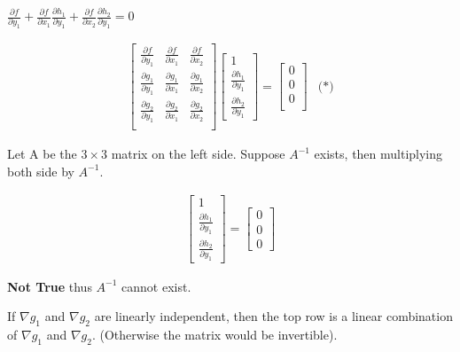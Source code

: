 \documentclass[11pt]{article}
\begin{document}
\(\frac{\partial f}{\partial y_1} + \frac{\partial f}{\partial x_1}\frac{\partial h_1}{\partial y_1} + \frac{\partial f}{\partial x_2} \frac{\partial h_2}{\partial y_1} = 0\)

\begin{equation}
\begin{split}
\begin{bmatrix}
\frac{\partial f}{\partial y_1} & \frac{\partial f}{\partial x_1} & \frac{\partial f}{\partial x_2}\\
\frac{\partial g_1}{\partial y_1} & \frac{\partial g_1}{\partial x_1} & \frac{\partial g_1}{\partial x_2}\\
\frac{\partial g_2}{\partial y_1} & \frac{\partial g_2}{\partial x_1} & \frac{\partial g_2}{\partial x_2}\\
\end{bmatrix} \begin{bmatrix}
1\\ \frac{\partial h_1}{\partial y_1}\\ \frac{\partial h_2}{\partial y_1}
\end{bmatrix} = \begin{bmatrix}
0\\ 0\\ 0\\
\end{bmatrix} & \text{(*)}
\end{split}
\end{equation}

Let A be the \(3 \times 3\) matrix on the left side. Suppose \(A^{-1}\) exists, then
multiplying both side by \(A^{-1}\).

\begin{equation}
\begin{split}
\begin{bmatrix}
1\\ \frac{\partial h_1}{\partial y_1}\\ \frac{\partial h_2}{\partial y_1}
\end{bmatrix} = \begin{bmatrix}
0\\ 0\\ 0
\end{bmatrix}
\end{split}
\end{equation}

\textbf{Not True} thus \(A^{-1}\) cannot exist.

If \(\nabla g_1\) and \(\nabla g_2\) are linearly independent, then the top row is a
linear combination of \(\nabla g_1\) and \(\nabla g_2\). (Otherwise the matrix would
be invertible).
\end{document}
